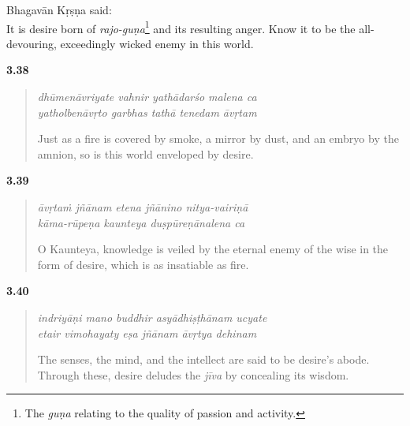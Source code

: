 {\hspace*{1em}Bhagavān Kṛṣṇa said: \\
It is desire born of \textit{rajo-guṇa}\footnote{The \textit{guṇa} relating to the quality of passion and activity.} and its resulting anger. Know it to be the all-devouring, exceedingly wicked enemy in this world.} 


\par\noindent\textbf{3.38}\par
\begin{verse}
\textit{dhūmenāvriyate vahnir yathādarśo malena ca} \\
\textit{yatholbenāvṛto garbhas tathā tenedam āvṛtam}

\noindent Just as a fire is covered by smoke, a mirror by dust, and an embryo by the amnion, so is this world enveloped by desire.
\end{verse}
\par



\par\noindent\textbf{3.39}\par
\begin{verse}
\textit{āvṛtaṁ jñānam etena jñānino nitya-vairiṇā} \\
\textit{kāma-rūpeṇa kaunteya duṣpūreṇānalena ca}

\noindent O Kaunteya, knowledge is veiled by the eternal enemy of the wise in the form of desire, which is as insatiable as fire.
\end{verse}
\par



\par\noindent\textbf{3.40}\par
\begin{verse}
\textit{indriyāṇi mano buddhir asyādhiṣṭhānam ucyate} \\
\textit{etair vimohayaty eṣa jñānam āvṛtya dehinam}

\noindent The senses, the mind, and the intellect are said to be desire’s abode. Through these, desire deludes the \textit{jīva} by concealing its wisdom.
\end{verse}
\par



